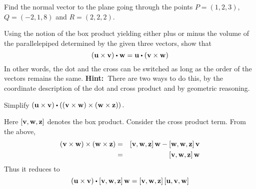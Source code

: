\begin{enumialphparenastyle}
\begin{ex} Find the normal vector to the plane going through the points $P=(1,2,3)$, $Q=(-2,1,8)$ and $R=(2,2,2)$.
\end{ex}

\begin{ex} Using the notion of the box product yielding either plus or minus the
volume of the parallelepiped determined by the given three vectors, show
that
\begin{equation*}
\left( \vect{u}\times \vect{v}\right) \dotprod \vect{w}=\vect{u}\dotprod \left(
\vect{v}\times \vect{w}\right)
\end{equation*}
In other words, the dot and the cross can be switched as long as the order
of the vectors remains the same. \textbf{Hint:\ }There are two ways to do
this, by the coordinate description of the dot and cross product and by
geometric reasoning. 
\end{ex}

\begin{ex} Simplify $\left( \vect{u}\times \vect{v}\right) \dotprod \left( \left( 
\vect{v}\times \vect{w}\right) \times \left( \vect{w}\times \vect{z}\right)\right) .$
\begin{sol}
Here $\left[ {\bf v},{\bf w},{\bf z}\right]$ denotes the box product. Consider the cross product term. From the above,
\begin{eqnarray*}
\left( {\bf v}\times {\bf w}\right) \times \left( {\bf w}\times {\bf z}\right) &=& 
\left[ {\bf v},{\bf w},{\bf z}\right] {\bf w}-\left[ {\bf w},{\bf w},{\bf z}\right] {\bf v} \\
&=&\left[ {\bf v},{\bf w},{\bf z}\right] {\bf w}
\end{eqnarray*}
Thus it reduces to
\[
\left( \vect{u}\times \vect{v}\right) \dotprod \left[ \vect{v},\vect{w},\vect{z}\right] \vect{w}=\left[ \vect{v},\vect{w},\vect{z}\right] \left[ \vect{u},\vect{v},\vect{w}\right]
\]
\end{sol}
\end{ex}


\end{enumialphparenastyle}
